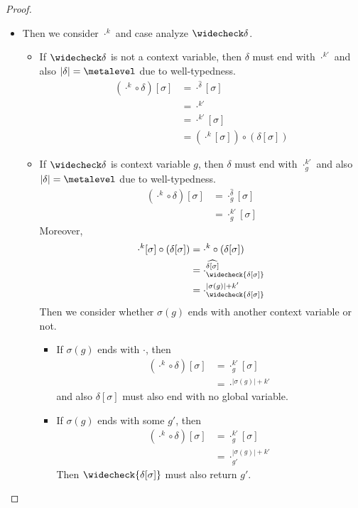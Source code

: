 \begin{proof}
\begin{itemize}[label=Case]
  \item Then we consider $\cdot^k$ and case analyze $\widecheck \delta$.
    \begin{itemize}[label=Subcase]
    \item If $\widecheck\delta$ is not a context variable, then $\delta$ must end
      with $\cdot^{k'}$ and also $|\delta| = \metalevel$ due to well-typedness.
      \begin{align*}
        (\cdot^k \circ \delta)[\sigma]
        &= \cdot^{\widehat \delta}[\sigma] \\
        &= \cdot^{k'} \\
        &= \cdot^{k'}[\sigma] \\
        &= (\cdot^k[\sigma]) \circ (\delta[\sigma])
      \end{align*}
    \item If $\widecheck\delta$ is context variable $g$, then $\delta$ must end
      with $\cdot^{k'}_g$ and also $|\delta| = \metalevel$ due to well-typedness.
      \begin{align*}
        (\cdot^k \circ \delta)[\sigma]
        &= \cdot^{\widehat \delta}_g[\sigma] \\
        &= \cdot^{k'}_g[\sigma]
      \end{align*}
      Moreover,
      \begin{align*}
        \cdot^k[\sigma] \circ (\delta[\sigma])
        &= \cdot^k \circ (\delta[\sigma]) \\
        &= \cdot^{\widehat{\delta[\sigma]}}_{\widecheck{\delta[\sigma]}} \\
        &= \cdot^{|\sigma(g)| + k'}_{\widecheck{\delta[\sigma]}}
      \end{align*}
      Then we consider whether $\sigma(g)$ ends with another context variable or
      not.
      \begin{itemize}[label=Subsubcase]
      \item If $\sigma(g)$ ends with $\cdot$, then 
        \begin{align*}
          (\cdot^k \circ \delta)[\sigma]
          &= \cdot^{k'}_g[\sigma] \\
          &= \cdot^{|\sigma(g)| + k'}
        \end{align*}
        and also $\delta[\sigma]$ must also end with no global variable.
      \item If $\sigma(g)$ ends with some $g'$, then 
        \begin{align*}
          (\cdot^k \circ \delta)[\sigma]
          &= \cdot^{k'}_g[\sigma] \\
          &= \cdot^{|\sigma(g)| + k'}_{g'}
        \end{align*}
        Then $\widecheck{\delta[\sigma]}$ must also return $g'$. 
      \end{itemize}
    \end{itemize}
  \end{itemize}
\end{proof}

